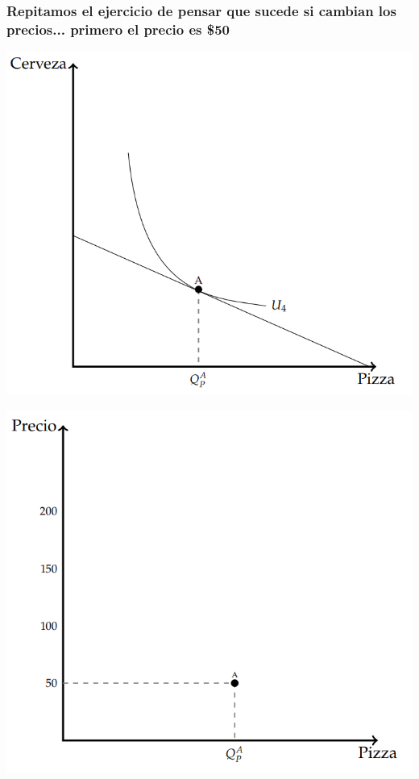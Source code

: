 \documentclass{beamer}
\begin{document}
\begin{frame}
\frametitle{Repitamos el ejercicio de pensar que sucede si cambian los precios... primero el precio es \$50}
\begin{center}
  \begin{minipage}{0.48\textwidth}
      \includegraphics[width=\linewidth]{../Figures/C8.11.png}
  \end{minipage}\hfill
  \begin{minipage}{0.48\textwidth}
      \includegraphics[width=\linewidth]{../Figures/C8.12.png}
  \end{minipage}
\end{center}
\end{frame}
\end{document}
